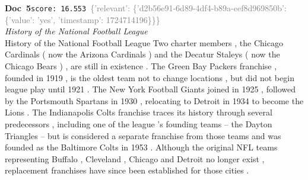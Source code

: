 \documentclass[a4paper,11pt]{article}
\begin{document}
\begin{docenv}
{\footnotesize\textcolor{doccolor}{\textbf{Doc~5}}}\hfill{\tiny\texttt{score:~16.553}}\ {\tiny\textcolor{gray}{\{'relevant': \{'d2b56e91-6d89-4df4-b89a-eef8d969850b': \{'value': 'yes', 'timestamp': 1724714196\}\}\}}}\\[3pt]
{\small\textit{History of the National Football League}}\\[2pt]
\vspace{2pt}
{\footnotesize History of the National Football League
Two charter members , the Chicago Cardinals ( now the Arizona Cardinals ) and the Decatur Staleys ( now the Chicago Bears ) , are still in existence . The Green Bay Packers franchise , founded in 1919 , is the oldest team not to change locations , but did not begin league play until 1921 . The New York Football Giants joined in 1925 , followed by the Portsmouth Spartans in 1930 , relocating to Detroit in 1934 to become the Lions . The Indianapolis Colts franchise traces its history through several predecessors , including one of the league 's founding teams -- the Dayton Triangles -- but is considered a separate franchise from those teams and was founded as the Baltimore Colts in 1953 . Although the original NFL teams representing Buffalo , Cleveland , Chicago and Detroit no longer exist , replacement franchises have since been established for those cities .}
\end{docenv}
\end{document}
